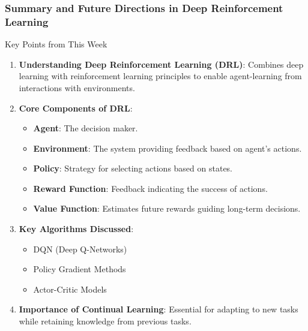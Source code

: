 \documentclass[aspectratio=169]{beamer}
\begin{document}
\begin{frame}[fragile]
    \frametitle{Summary and Future Directions in Deep Reinforcement Learning}

    \begin{block}{Key Points from This Week}
        \begin{enumerate}
            \item \textbf{Understanding Deep Reinforcement Learning (DRL)}: 
            Combines deep learning with reinforcement learning principles to enable agent-learning from interactions with environments.
            \item \textbf{Core Components of DRL}:
            \begin{itemize}
                \item \textbf{Agent}: The decision maker.
                \item \textbf{Environment}: The system providing feedback based on agent's actions.
                \item \textbf{Policy}: Strategy for selecting actions based on states.
                \item \textbf{Reward Function}: Feedback indicating the success of actions.
                \item \textbf{Value Function}: Estimates future rewards guiding long-term decisions.
            \end{itemize}
            \item \textbf{Key Algorithms Discussed}:
            \begin{itemize}
                \item DQN (Deep Q-Networks)
                \item Policy Gradient Methods
                \item Actor-Critic Models
            \end{itemize}
            \item \textbf{Importance of Continual Learning}: Essential for adapting to new tasks while retaining knowledge from previous tasks.
        \end{enumerate}
    \end{block}
\end{frame}
\end{document}

